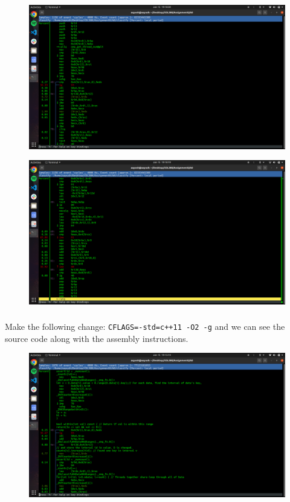 \documentclass{article}
\begin{document}
\begin{figure}[H]
\centering
\includegraphics[width=1\textwidth]{images/2_3.1.png}
\end{figure}



\begin{figure}[H]
    \centering
    \includegraphics[width=1\textwidth]{images/2_3.2.png}
    \end{figure}

\subsubsection{}
Make the following change: \texttt{CFLAGS=-std=c++11 -O2 -g} and we can see the source code along with the assembly instructions.

\begin{figure}[H]
\centering
\includegraphics[width=1\textwidth]{images/2_5.png}
\end{figure}
\end{document}
